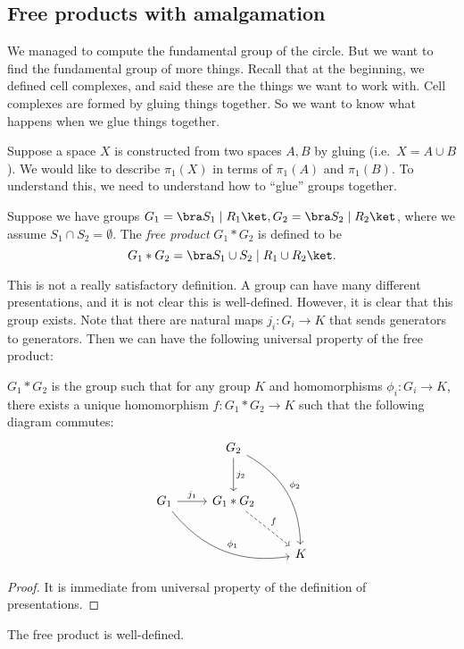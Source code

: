 \documentclass[a4paper]{article}
\begin{document}
\subsection{Free products with amalgamation}
We managed to compute the fundamental group of the circle. But we want to find the fundamental group of more things. Recall that at the beginning, we defined cell complexes, and said these are the things we want to work with. Cell complexes are formed by gluing things together. So we want to know what happens when we glue things together.

Suppose a space $X$ is constructed from two spaces $A, B$ by gluing (i.e.\ $X = A\cup B$). We would like to describe $\pi_1(X)$ in terms of $\pi_1(A)$ and $\pi_1(B)$. To understand this, we need to understand how to ``glue'' groups together.

\begin{defi}
  Suppose we have groups $G_1 = \bra S_1 \mid R_1\ket, G_2 = \bra S_2 \mid R_2\ket$, where we assume $S_1 \cap S_2 = \emptyset$. The \emph{free product} $G_1 * G_2$ is defined to be
  \[
    G_1 * G_2 = \bra S_1 \cup S_2 \mid R_1 \cup R_2\ket.
  \]
\end{defi}
This is not a really satisfactory definition. A group can have many different presentations, and it is not clear this is well-defined. However, it is clear that this group exists. Note that there are natural maps $j_i: G_i \to K$ that sends generators to generators. Then we can have the following universal property of the free product:

\begin{lemma}
  $G_1 * G_2$ is the group such that for any group $K$ and homomorphisms $\phi_i: G_i \to K$, there exists a unique homomorphism $f: G_1 * G_2 \to K$ such that the following diagram commutes:
  \[
    \begin{tikzcd}[row sep=large]
      & G_2 \ar[rdd, bend left, "\phi_2"] \ar[d, "j_2"]\\
      G_1 \ar[rrd, bend right, "\phi_1"] \ar [r, "j_1"] & G_1 * G_2 \ar [rd, dashed, "f"]\\
      && K
    \end{tikzcd}
  \]
\end{lemma}

\begin{proof}
  It is immediate from universal property of the definition of presentations.
\end{proof}

\begin{cor}
  The free product is well-defined.
\end{cor}
\end{document}

